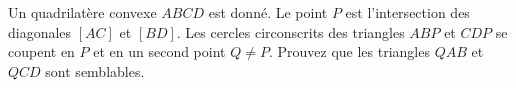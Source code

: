 Un quadrilatère convexe $ABCD$ est donné. Le point $P$ est l'intersection
des diagonales $[AC]$ et $[BD]$. Les cercles circonscrits des triangles $ABP$
et $CDP$ se coupent en $P$ et en un second point $Q \neq P$. Prouvez que les
triangles $QAB$ et $QCD$ sont semblables.
